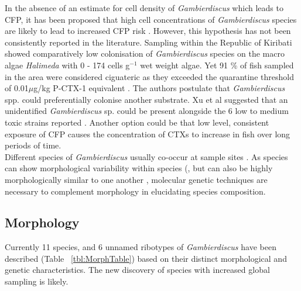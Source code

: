 \documentclass[12pt]{article}
\begin{document}


In the absence of an estimate for cell density of \emph{Gambierdiscus} which leads to CFP, it has been proposed  that high cell concentrations of \emph{Gambierdiscus} species are likely to lead to increased CFP risk \cite{litaker2010global}. 
However, this hypothesis has not been consistently reported in the literature. Sampling within the Republic of Kiribati showed comparatively low colonisation of \emph{Gambierdiscus} species on the macro algae \emph{Halimeda} with 0 - 174 cells g$^{-1}$ wet weight algae. Yet 91 \% of fish sampled in the area were considered ciguateric as they exceeded the quarantine threshold of 0.01$\mu$g/kg P-CTX-1 equivalent \cite{xu2014distribution,chan2011spatial}. The authors postulate that \emph{Gambierdiscus} spp. could preferentially colonise another substrate. Xu et al suggested that an unidentified \emph{Gambierdiscus} sp. could be present alongside the 6 low to medium toxic strains reported \cite{xu2014distribution,bomber1988r}. Another option could be that low level, consistent exposure of CFP causes the concentration of CTXs to increase in fish over long periods of time.\\

Different species of \emph{Gambierdiscus} usually co-occur at sample sites \cite{litaker2010global}. As species can show morphological variability within species (\cite{bravo2014cellular}, but can also be highly morphologically similar to one another \cite{kohli2014high}, molecular genetic techniques are necessary to complement morphology in elucidating species composition.

\subsection{Morphology}
Currently 11 species, and 6 unnamed ribotypes of \emph{Gambierdiscus} have been described (Table ~\ref{tbl:MorphTable}) based on their distinct morphological and genetic characteristics. The new discovery of species with increased global sampling is likely. \\
\end{document}
